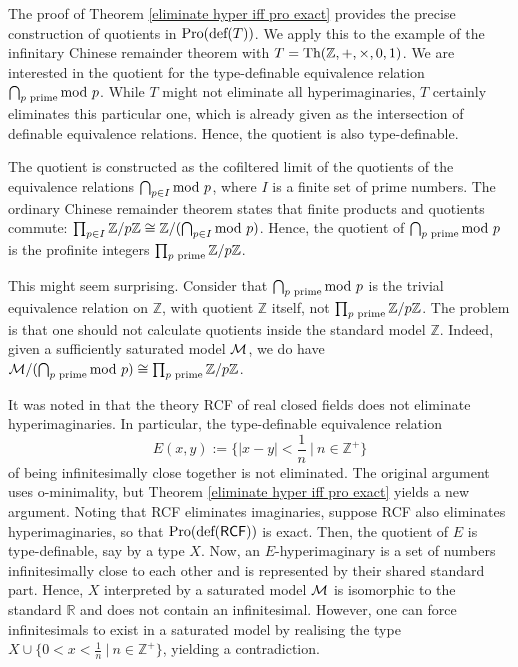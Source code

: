 \smallskip

The proof of Theorem \ref{eliminate hyper iff pro exact} provides the precise construction of quotients in $\textup{Pro}(\textup{def}(T))$. We apply this to the example of the infinitary Chinese remainder theorem with $T=\textup{Th}(\mathbb{Z},+,\times,0,1)$. We are interested in the quotient for the type-definable equivalence relation $\bigcap_{p \textup{ prime}} \textup{mod }p$. While $T$ might not eliminate all hyperimaginaries, $T$ certainly eliminates this particular one, which is already given as the intersection of definable equivalence relations. Hence, the quotient is also type-definable.

The quotient is constructed as the cofiltered limit of the quotients of the equivalence relations $\bigcap_{p\in I} \textup{mod } p$, where $I$ is a finite set of prime numbers.
The ordinary Chinese remainder theorem states that finite products and quotients commute: $\prod_{p\in I}\mathbb{Z}/p\mathbb{Z} \cong \mathbb{Z}/(\bigcap_{p\in I}\textup{mod }p)$. Hence, the quotient of $\bigcap_{p \textup{ prime}} \textup{mod }p$ is the profinite integers $\prod_{p \textup{ prime}}\mathbb{Z}/p\mathbb{Z}$.

This might seem surprising. Consider that $\bigcap_{p \textup{ prime}} \textup{mod }p$ is the trivial equivalence relation on $\mathbb{Z}$, with quotient $\mathbb{Z}$ itself, not $\prod_{p \textup{ prime}}\mathbb{Z}/p\mathbb{Z}$. The problem is that one should not calculate quotients inside the standard model $\mathbb{Z}$. Indeed, given a sufficiently saturated model $\mathcal{M}$, we do have $\mathcal{M}/(\bigcap_{p \textup{ prime}} \textup{mod }p) \cong \prod_{p \textup{ prime}} \mathbb{Z}/p\mathbb{Z}$. 

\begin{example}
    It was noted in \cite[\S1]{Pillay_Poizat_1987} that the theory \textsf{RCF} of real closed fields does not eliminate hyperimaginaries. In particular, the type-definable equivalence relation 
    \[ E(x,y):= \{|x-y| < \frac{1}{n} \ | \ n\in\mathbb{Z}^+ \}\]
    of being infinitesimally close together is not eliminated. The original argument uses o-minimality, but Theorem \ref{eliminate hyper iff pro exact} yields a new argument. Noting that \textsf{RCF} eliminates imaginaries, suppose \textsf{RCF} also eliminates hyperimaginaries, so that $\textup{Pro}(\textup{def}(\textsf{RCF}))$ is exact. Then, the quotient of $E$ is type-definable, say by a type $X$. Now, an $E$-hyperimaginary is a set of numbers infinitesimally close to each other and is represented by their shared standard part. Hence, $X$ interpreted by a saturated model $\mathcal{M}$ is isomorphic to the standard $\mathbb{R}$ and does not contain an infinitesimal. However, one can force infinitesimals to exist in a saturated model by realising the type $X\cup\{0<x<\frac{1}{n}\ | \ n\in\mathbb{Z}^+ \}$, yielding a contradiction.
\end{example}

